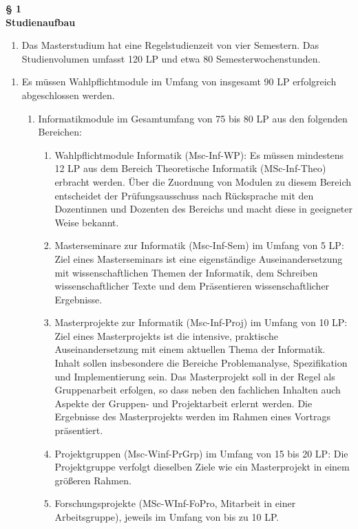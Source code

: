 \documentclass{article}\usepackage{helvet}\renewcommand{\familydefault}{\sfdefault}\usepackage[letterpaper,top=2cm,bottom=2cm,left=3cm,right=3cm,marginparwidth=1.75cm]{geometry}\usepackage[colorlinks=true,allcolors=red]{hyperref}\usepackage{enumitem}\usepackage{tabularx}\usepackage[T1]{fontenc}\setlist[enumerate,1]{label=\arabic*., left=0pt}\setlist[enumerate,2]{label=\alph*., left=0.5em}\setlist[enumerate,3]{label=\alph*\alph*., left=1em}\setlist[enumerate,4]{label=-, left=1.5em}\setlist{nosep}\setlength{\parindent}{0pt}
\begin{document}
	\hypertarget{label}{
	\begin{center}
		\textbf{§ 1\\Studienaufbau}
	\end{center}
}
	\begin{enumerate}[start=1,label=(\arabic*)]
		\item{Das Masterstudium hat eine Regelstudienzeit von vier Semestern. Das Studienvolumen umfasst 120 LP und etwa 80 Semesterwochenstunden.}
	\end{enumerate}

	\begin{enumerate}[start=2,label=(\arabic*)]
		\item{Es müssen Wahlpflichtmodule im Umfang von insgesamt 90 LP erfolgreich abgeschlossen werden.
		\begin{enumerate}[label=\arabic*.]
			\item{Informatikmodule im Gesamtumfang von 75 bis 80 LP aus den folgenden Bereichen:
			\begin{enumerate}[label=\alph*)]
				\item{Wahlpflichtmodule Informatik (Msc-Inf-WP): Es müssen mindestens 12 LP aus dem Bereich Theoretische Informatik (MSc-Inf-Theo) erbracht werden. Über die Zuordnung von Modulen zu diesem Bereich entscheidet der Prüfungsausschuss nach Rücksprache mit den Dozentinnen und Dozenten des Bereichs und macht diese in geeigneter Weise bekannt.}
				\item{\hypertarget{numb}{}Masterseminare zur Informatik (Msc-Inf-Sem) im Umfang von 5 LP: Ziel eines Masterseminars ist eine eigenständige Auseinandersetzung mit wissenschaftlichen Themen der Informatik, dem Schreiben wissenschaftlicher Texte und dem Präsentieren wissenschaftlicher Ergebnisse.}
				\item{Masterprojekte zur Informatik (Msc-Inf-Proj) im Umfang von 10 LP: Ziel eines Masterprojekts ist die intensive, praktische Auseinandersetzung mit einem aktuellen Thema der Informatik. Inhalt sollen insbesondere die Bereiche Problemanalyse, Spezifikation und Implementierung sein. Das Masterprojekt soll in der Regel als Gruppenarbeit erfolgen, so dass neben den fachlichen Inhalten auch Aspekte der Gruppen- und Projektarbeit erlernt werden. Die Ergebnisse des Masterprojekts werden im Rahmen eines Vortrags präsentiert.}
				\item{Projektgruppen (Msc-Winf-PrGrp) im Umfang von 15 bis 20 LP: Die Projektgruppe verfolgt dieselben Ziele wie ein Masterprojekt in einem größeren Rahmen.}
				\item{\hypertarget{nume}{}Forschungsprojekte (MSc-WInf-FoPro, Mitarbeit in einer Arbeitsgruppe), jeweils im Umfang von bis zu 10 LP.}

\end{enumerate}}
\end{enumerate}}
\end{enumerate}
\end{document}
